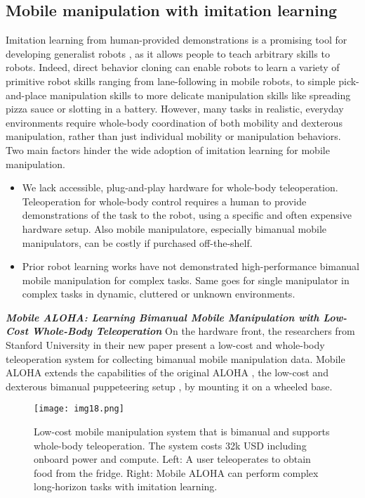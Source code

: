 \subsection{Mobile manipulation with imitation learning}

Imitation learning from human-provided demonstrations is a promising tool for developing generalist
robots \cite{tony2024mobile}, as it allows people to teach arbitrary skills to robots. 
Indeed, direct behavior cloning can enable robots to learn a variety of primitive robot skills
ranging from lane-following in mobile robots, to simple pick-and-place manipulation skills
to more delicate manipulation skills like spreading pizza sauce or slotting in a battery.
However, many tasks in realistic, everyday environments require whole-body coordination of both mobility
and dexterous manipulation, rather than just individual mobility or manipulation behaviors.
Two main factors hinder the wide adoption of imitation learning for mobile manipulation. 

\begin{itemize}
	\item We lack accessible, plug-and-play hardware for whole-body teleoperation. Teleoperation
	for whole-body control requires a human to provide demonstrations of the task to the robot, 
	using a specific and often expensive hardware setup. Also mobile manipulatore,
	especially bimanual mobile manipulators, can be costly if purchased off-the-shelf.
	\item Prior robot learning works have not demonstrated high-performance bimanual mobile manipulation
	for complex tasks. Same goes for single manipulator in complex tasks in dynamic, 
	cluttered or unknown environments.
\end{itemize}

\textbf{\textit{Mobile ALOHA: Learning Bimanual Mobile Manipulation with
Low-Cost Whole-Body Teleoperation}} \quad
On the hardware front, the researchers from Stanford University in their new paper \cite{tony2024mobile}
present a low-cost and whole-body teleoperation system for collecting bimanual mobile manipulation
data. Mobile ALOHA extends the capabilities of the original ALOHA \cite{tony2023bimanual},
the low-cost and dexterous bimanual puppeteering setup \cite{tony2023bimanual},
by mounting it on a wheeled base.

\begin{figure}[H]
	\centering
	\texttt{[image: img18.png]}
	\captionsetup{width=1\linewidth}
	\caption{Low-cost mobile manipulation system that is bimanual and supports whole-body teleoperation. 
	The system costs 32k USD including onboard power and compute. Left: A user teleoperates to 
	obtain food from the fridge. Right: Mobile ALOHA can perform complex long-horizon tasks
	with imitation learning. \cite{tony2024mobile}}
	\label{fig:img18}
\end{figure}

